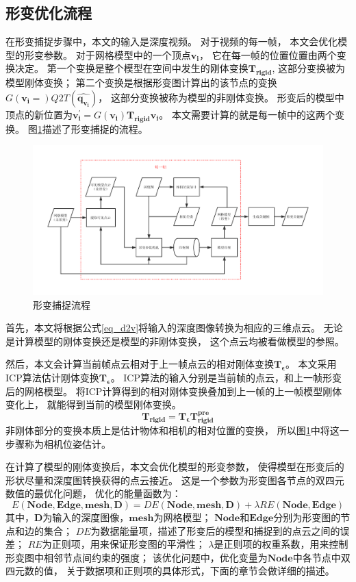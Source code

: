 \subsection{形变优化流程}
在形变捕捉步骤中，本文的输入是深度视频。
对于视频的每一帧，
本文会优化模型的形变参数。
对于网格模型中的一个顶点$\bm{v_i}$，
它在每一帧的位置位置由两个变换决定。
第一个变换是整个模型在空间中发生的刚体变换$\bm{T_{rigid}}$,
这部分变换被为模型刚体变换；
第二个变换是根据形变图计算出的该节点的变换$G(\bm{v_i}=)Q2T(\hat{\bm{q_{v_i}}})$，
这部分变换被称为模型的非刚体变换。
形变后的模型中顶点的新位置为$\bm{v_i^{'}}=G(\bm{v_i})\bm{T_{rigid}}\bm{v_i}$。
本文需要计算的就是每一帧中的这两个变换。
图\ref{deformation_sampling}描述了形变捕捉的流程。
\begin{figure}
    \centering
    \includegraphics[width = \textwidth]{./Pictures/ds_pipeline_cropped.pdf}
    \caption{形变捕捉流程}
    \label{deformation_sampling}
\end{figure}
首先，本文将根据公式\ref{eq_d2v}将输入的深度图像转换为相应的三维点云。
无论是计算模型的刚体变换还是模型的非刚体变换，
这个点云均被看做模型的参照。

然后，本文会计算当前帧点云相对于上一帧点云的相对刚体变换$\bm{T_{\epsilon }}$。
本文采用ICP算法估计刚体变换$\bm{T_{\epsilon }}$。
ICP算法的输入分别是当前帧的点云，和上一帧形变后的网格模型。 
将ICP计算得到的相对刚体变换叠加到上一帧的上一帧模型刚体变化上，
就能得到当前的模型刚体变换。
\begin{equation}
    \bm{T_{rigid}}=\bm{T_{\epsilon}}\bm{T_{rigid}^{pre}}
\end{equation}
非刚体部分的变换本质上是估计物体和相机的相对位置的变换，
所以图\ref{deformation_sampling}中将这一步骤称为相机位姿估计。

在计算了模型的刚体变换后，本文会优化模型的形变参数，
使得模型在形变后的形状尽量和深度图转换获得的点云接近。
这是一个参数为形变图各节点的双四元数值的最优化问题，
优化的能量函数为：
\begin{equation}
    E(\bm{Node},\bm{Edge},\bm{mesh},\bm{D})=DE(\bm{Node},\bm{mesh},\bm{D})+
    \lambda RE(\bm{Node},\bm{Edge})
\end{equation}
其中，$\bm{D}$为输入的深度图像，$\bm{mesh}$为网格模型；
$\bm{Node}$和$\bm{Edge}$分别为形变图的节点和边的集合；
$DE$为数据能量项，描述了形变后的模型和捕捉到的点云之间的误差；
$RE$为正则项，用来保证形变图的平滑性；
$\lambda$是正则项的权重系数，用来控制形变图中相邻节点间约束的强度；
该优化问题中，优化变量为$\bm{Node}$中各节点中双四元数的值，
关于数据项和正则项的具体形式，下面的章节会做详细的描述。

